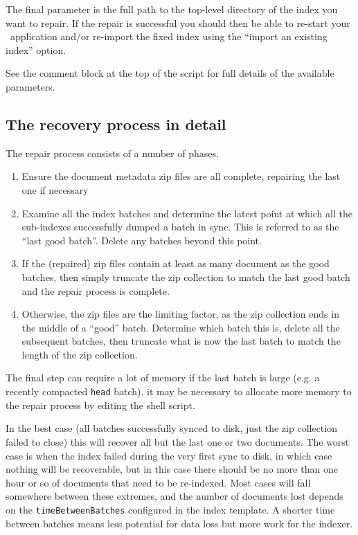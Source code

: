 The final parameter is the full path to the top-level directory of the index
you want to repair.  If the repair is successful you should then be able to
re-start your \Mimir\ application and/or re-import the fixed index using the
``import an existing index'' option.

See the comment block at the top of the script for full details of the
available parameters.

\subsection*{The recovery process in detail}

The repair process consists of a number of phases.

\begin{enumerate}
\item Ensure the document metadata zip files are all complete, repairing the
  last one if necessary
\item Examine all the index batches and determine the latest point at which all
  the sub-indexes successfully dumped a batch in sync.  This is referred to as
  the ``last good batch''.  Delete any batches beyond this point.
\item If the (repaired) zip files contain at least as many document as the good
  batches, then simply truncate the zip collection to match the last good batch
  and the repair process is complete.
\item Otherwise, the zip files are the limiting factor, as the zip collection
  ends in the middle of a ``good'' batch.  Determine which batch this is,
  delete all the subsequent batches, then truncate what is now the last batch
  to match the length of the zip collection.
\end{enumerate}

The final step can require a lot of memory if the last batch is large (e.g. a
recently compacted \verb!head! batch), it may be necessary to allocate more
memory to the repair process by editing the shell script.

In the best case (all batches successfully synced to disk, just the zip
collection failed to close) this will recover all but the last one or two
documents.  The worst case is when the index failed during the very first sync
to disk, in which case nothing will be recoverable, but in this case there
should be no more than one hour or so of documents that need to be re-indexed.
Most cases will fall somewhere between these extremes, and the number of
documents lost depends on the \verb!timeBetweenBatches! configured in the index
template.  A shorter time between batches means less potential for data loss
but more work for the indexer.
